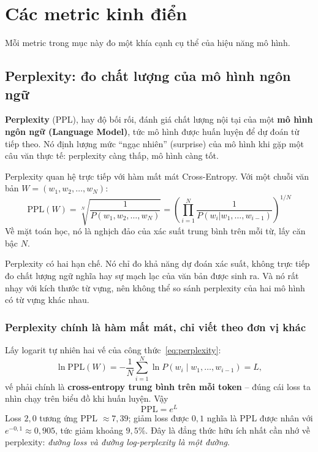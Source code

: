 

\section{Các metric kinh điển}
\label{sec:classic_metrics}

Mỗi metric trong mục này đo một khía cạnh cụ thể của hiệu năng mô hình.

\subsection{Perplexity: đo chất lượng của mô hình ngôn ngữ}
\label{ssec:perplexity}
\textbf{Perplexity} (PPL), hay độ bối rối, đánh giá chất lượng nội tại của một \textbf{mô hình ngôn ngữ (Language Model)}, tức mô hình được huấn luyện để dự đoán từ tiếp theo. Nó định lượng mức “ngạc nhiên” (surprise) của mô hình khi gặp một câu văn thực tế: perplexity càng thấp, mô hình càng tốt.

Perplexity quan hệ trực tiếp với hàm mất mát Cross-Entropy. Với một chuỗi văn bản $W = (w_1, w_2, \dots, w_N)$:
\begin{equation}
    \text{PPL}(W) = \sqrt[N]{\frac{1}{P(w_1, w_2, \dots, w_N)}} = \left( \prod_{i=1}^{N} \frac{1}{P(w_i|w_1, \dots, w_{i-1})} \right)^{1/N}
    \label{eq:perplexity}
\end{equation}
Về mặt toán học, nó là nghịch đảo của xác suất trung bình trên mỗi từ, lấy căn bậc $N$.

Perplexity có hai hạn chế. Nó chỉ đo khả năng dự đoán xác suất, không trực tiếp đo chất lượng ngữ nghĩa hay sự mạch lạc của văn bản được sinh ra. Và nó rất nhạy với kích thước từ vựng, nên không thể so sánh perplexity của hai mô hình có từ vựng khác nhau.

\subsubsection{Perplexity chính là hàm mất mát, chỉ viết theo đơn vị khác}
Lấy logarit tự nhiên hai vế của công thức~\eqref{eq:perplexity}:
\[
\ln \text{PPL}(W) = -\frac{1}{N}\sum_{i=1}^{N} \ln P(w_i \mid w_1, \dots, w_{i-1}) = L ,
\]
vế phải chính là \textbf{cross-entropy trung bình trên mỗi token} -- đúng cái loss ta nhìn chạy trên biểu đồ khi huấn luyện. Vậy
\[
\boxed{\ \text{PPL} = e^{L}\ }
\]
Loss $2{,}0$ tương ứng PPL $\approx 7{,}39$; giảm loss được $0{,}1$ nghĩa là PPL được nhân với $e^{-0{,}1} \approx 0{,}905$, tức giảm khoảng $9{,}5\%$. Đây là đẳng thức hữu ích nhất cần nhớ về perplexity: \emph{đường loss và đường log-perplexity là một đường}.

